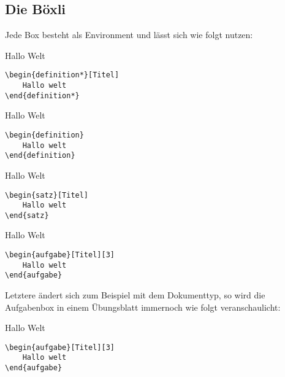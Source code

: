\subsection[Wie funktionieren Boxen]{Die Böxli}
Jede Box besteht als Environment und lässt sich wie folgt nutzen: 
\begin{multicols}{2}
\begin{definition*}[Titel]
    Hallo Welt
\begin{lstlisting}[style=latex]
\begin{definition*}[Titel]
    Hallo welt
\end{definition*}\end{lstlisting}
\end{definition*}

\begin{definition}
    Hallo Welt
\begin{lstlisting}[style=latex]
\begin{definition}
    Hallo welt
\end{definition}\end{lstlisting}
\end{definition}

\begin{satz}[Titel]
    Hallo Welt
\begin{lstlisting}[style=latex]
\begin{satz}[Titel]
    Hallo welt
\end{satz}\end{lstlisting}
\end{satz}

\begin{aufgabe}[Titel][3]
    Hallo Welt
\begin{lstlisting}[style=latex]
\begin{aufgabe}[Titel][3]
    Hallo welt
\end{aufgabe}\end{lstlisting}
\end{aufgabe}
\end{multicols}
Letztere ändert sich zum Beispiel mit dem Dokumenttyp, so wird die Aufgabenbox in einem Übungsblatt immernoch wie folgt veranschaulicht:
\begin{aufgabe}[Titel][3]
    Hallo Welt
\begin{lstlisting}[style=latex]
\begin{aufgabe}[Titel][3]
    Hallo welt
\end{aufgabe}\end{lstlisting}
\end{aufgabe}
